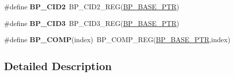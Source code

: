 \begin{DoxyCompactItemize}
\#define {\bfseries B\+P\+\_\+\+C\+I\+D2}~B\+P\+\_\+\+C\+I\+D2\+\_\+\+R\+EG(\hyperlink{group___b_p___peripheral_ga375cd6d2e7ec414f4e33cb54d5494940}{B\+P\+\_\+\+B\+A\+S\+E\+\_\+\+P\+TR})
\item 
\mbox{\label{group___b_p___register___accessor___macros_gaa9964a6a353ac63f76306563fda7b188}} 
\#define {\bfseries B\+P\+\_\+\+C\+I\+D3}~B\+P\+\_\+\+C\+I\+D3\+\_\+\+R\+EG(\hyperlink{group___b_p___peripheral_ga375cd6d2e7ec414f4e33cb54d5494940}{B\+P\+\_\+\+B\+A\+S\+E\+\_\+\+P\+TR})
\item 
\mbox{\label{group___b_p___register___accessor___macros_gafc2b6b687efce75bcd85d343d0d74fbd}} 
\#define {\bfseries B\+P\+\_\+\+C\+O\+MP}(index)~B\+P\+\_\+\+C\+O\+M\+P\+\_\+\+R\+EG(\hyperlink{group___b_p___peripheral_ga375cd6d2e7ec414f4e33cb54d5494940}{B\+P\+\_\+\+B\+A\+S\+E\+\_\+\+P\+TR},index)
\end{DoxyCompactItemize}


\subsection{Detailed Description}
